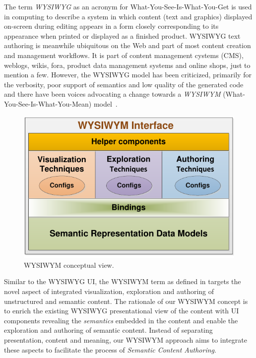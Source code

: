 \documentclass[journal]{IEEEtran}
\begin{document}
The term \emph{WYSIWYG} as an acronym for What-You-See-Is-What-You-Get is used in computing to describe a system in which content (text and graphics) displayed on-screen during editing appears in a form closely corresponding to its appearance when printed or displayed as a finished product.
WYSIWYG text authoring is meanwhile ubiquitous on the Web and part of most content creation and management workflows.
It is part of content management cystems (CMS), weblogs, wikis, fora, product data management systems and online shops, just to mention a few.
However, the WYSIWYG model has been criticized, primarily for the verbosity, poor support of semantics and low quality of the generated code and there have been voices advocating a change towards a \emph{WYSIWYM} (What-You-See-Is-What-You-Mean) model~\cite{Spiesser2004,Sauer2006}.

\begin{figure}[tb]
	\centering
		\includegraphics[width=1.0\columnwidth]{images/model.pdf}
	\caption{WYSIWYM conceptual view.}
	\label{fig:wysiwym}
\end{figure}

Similar to the WYSIWYG UI, the WYSIWYM term as defined in \cite{khaliliWISE2013} targets the novel aspect of integrated visualization, exploration and authoring of unstructured and semantic content.
The rationale of our WYSIWYM concept is to enrich the existing WYSIWYG presentational view of the content with UI components revealing the \emph{semantics} embedded in the content and enable the exploration and authoring of semantic content.
Instead of separating presentation, content and meaning, our WYSIWYM approach aims to integrate these aspects to facilitate the process of \emph{Semantic Content Authoring}.
\end{document}
